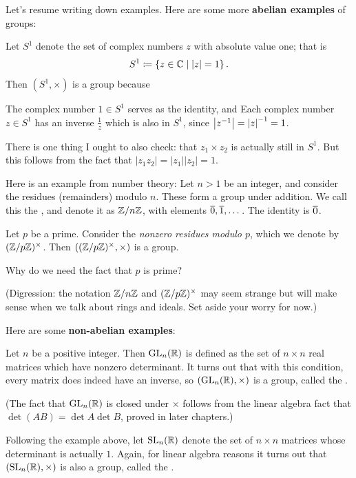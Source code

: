 Let's resume writing down examples.
Here are some more \textbf{abelian examples} of groups:
\begin{example}
	Let $S^1$ denote the set of complex numbers $z$ with absolute value one; that is
	\[ S^1 \coloneqq \left\{ z \in \mathbb C \mid \left\lvert z \right\rvert = 1 \right\}. \]
	Then $(S^1, \times)$ is a group because
	\begin{itemize}
		\ii The complex number $1 \in S^1$ serves as the identity, and
		\ii Each complex number $z \in S^1$ has an inverse $\frac 1z$ which is also in $S^1$, since $\left\lvert z^{-1} \right\rvert = \left\lvert z \right\rvert^{-1} = 1$.
	\end{itemize}
	There is one thing I ought to also check: that $z_1 \times z_2$ is actually still in $S^1$.
	But this follows from the fact that $\left\lvert z_1z_2 \right\rvert = \left\lvert z_1 \right\rvert \left\lvert z_2 \right\rvert = 1$.
\end{example}

\begin{example}
	Here is an example from number theory:
	Let $n > 1$ be an integer,
	and consider the residues (remainders) modulo $n$.
	These form a group under addition.
	We call this the ,
	and denote it as $\mathbb Z/n\mathbb Z$, with elements $\overline 0, \overline 1, \dots$.
	The identity is $\overline 0$.
	\label{def:cyclic_group}
\end{example}
\begin{example}
	Let $p$ be a prime.
	Consider the \emph{nonzero residues modulo $p$},
	which we denote by $(\mathbb Z/p\mathbb Z)^\times$.
	Then $\left( (\mathbb Z/p\mathbb Z)^\times, \times \right)$ is a group.
	\label{def:mult_mod_p}
\end{example}
\begin{ques}
	Why do we need the fact that $p$ is prime?
\end{ques}
(Digression: the notation $\mathbb Z/n\mathbb Z$ and $(\mathbb Z/p\mathbb Z)^\times$ may seem strange
but will make sense when we talk about rings and ideals.
Set aside your worry for now.)


Here are some \textbf{non-abelian examples}:
\begin{example}
	Let $n$ be a positive integer.
	Then $\operatorname{GL}_n(\mathbb R)$ is defined as the set of $n \times n$ real matrices
	which have nonzero determinant.
	It turns out that with this condition,
	every matrix does indeed have an inverse,
	so $(\operatorname{GL}_n(\mathbb R), \times)$ is a group, called the
	.

	(The fact that $\operatorname{GL}_n(\mathbb R)$ is closed under $\times$ follows
	from the linear algebra fact that $\det (AB) = \det A \det B$,
	proved in later chapters.)
\end{example}
\begin{example}
	Following the example above, let $\operatorname{SL}_n(\mathbb R)$ denote
	the set of $n \times n$ matrices whose determinant is actually $1$.
	Again, for linear algebra reasons
	it turns out that $(\operatorname{SL}_n(\mathbb R), \times)$ is also a group,
	called the .
\end{example}

